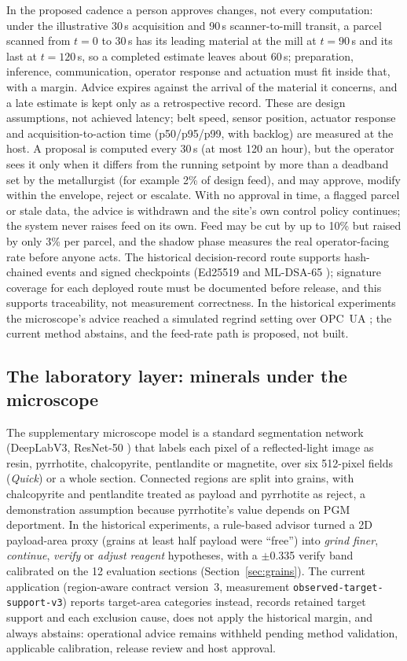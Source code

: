 \documentclass[10pt,a4paper,twocolumn]{article}
\begin{document}
In the proposed cadence a person approves changes, not every computation: under the illustrative 30\,s acquisition and 90\,s scanner-to-mill transit, a parcel scanned from $t=0$ to $30$\,s has its leading material at the mill at $t=90$\,s and its last at $t=120$\,s, so a completed estimate leaves about 60\,s; preparation, inference, communication, operator response and actuation must fit inside that, with a margin. Advice expires against the arrival of the material it concerns, and a late estimate is kept only as a retrospective record. These are design assumptions, not achieved latency; belt speed, sensor position, actuator response and acquisition-to-action time (p50/p95/p99, with backlog) are measured at the host. A proposal is computed every 30\,s (at most 120 an hour), but the operator sees it only when it differs from the running setpoint by more than a deadband set by the metallurgist (for example 2\% of design feed), and may approve, modify within the envelope, reject or escalate. With no approval in time, a flagged parcel or stale data, the advice is withdrawn and the site's own control policy continues; the system never raises feed on its own. Feed may be cut by up to 10\% but raised by only 3\% per parcel, and the shadow phase measures the real operator-facing rate before anyone acts. The historical decision-record route supports hash-chained events and signed checkpoints (Ed25519 and ML-DSA-65 \cite{fips204}); signature coverage for each deployed route must be documented before release, and this supports traceability, not measurement correctness. In the historical experiments the microscope's advice reached a simulated regrind setting over OPC~UA \cite{opcua}; the current method abstains, and the feed-rate path is proposed, not built.

\subsection{The laboratory layer: minerals under the microscope}\label{sec:micromethod}

The supplementary microscope model is a standard segmentation network (DeepLabV3, ResNet-50 \cite{chen2017,he2016}) that labels each pixel of a reflected-light image as resin, pyrrhotite, chalcopyrite, pentlandite or magnetite, over six 512-pixel fields (\emph{Quick}) or a whole section. Connected regions are split into grains, with chalcopyrite and pentlandite treated as payload and pyrrhotite as reject, a demonstration assumption because pyrrhotite's value depends on PGM deportment. In the historical experiments, a rule-based advisor turned a 2D payload-area proxy (grains at least half payload were ``free'') into \emph{grind finer}, \emph{continue}, \emph{verify} or \emph{adjust reagent} hypotheses, with a $\pm$0.335 verify band calibrated on the 12 evaluation sections (Section~\ref{sec:grains}). The current application (region-aware contract version~3, measurement \texttt{observed-target-support-v3}) reports target-area categories instead, records retained target support and each exclusion cause, does not apply the historical margin, and always abstains: operational advice remains withheld pending method validation, applicable calibration, release review and host approval.
\end{document}
